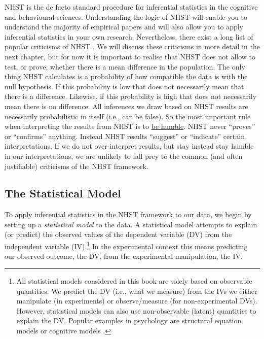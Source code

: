 \documentclass[
]{book}
\begin{document}
NHST is the de facto standard procedure for inferential statistics in the cognitive and behavioural sciences. Understanding the logic of NHST will enable you to understand the majority of empirical papers and will also allow you to apply inferential statistics in your own research. Nevertheless, there exist a long list of popular criticisms of NHST \citep[e.g.,][]{rozeboom1960, meehl1978, cohen1994, nickerson2000, wagenmakers2007}. We will discuss these criticisms in more detail in the next chapter, but for now it is important to realise that NHST does not allow to test, or prove, whether there is a mean difference in the population. The only thing NHST calculates is a probability of how compatible the data is with the null hypothesis. If this probability is low that does not necessarily mean that there is a difference. Likewise, if this probability is high that does not necessarily mean there is no difference. All inferences we draw based on NHST results are necessarily probabilistic in itself (i.e., can be false). So the most important rule when interpreting the results from NHST is to \href{https://youtu.be/tvTRZJ-4EyI}{be humble}. NHST never ``proves'' or ``confirms'' anything. Instead NHST results ``suggest'' or ``indicate'' certain interpretations. If we do not over-interpret results, but stay instead stay humble in our interpretations, we are unlikely to fall prey to the common (and often justifiable) criticisms of the NHST framework.

\hypertarget{the-statistical-model}{%
\subsection{The Statistical Model}\label{the-statistical-model}}

To apply inferential statistics in the NHST framework to our data, we begin by setting up a \emph{statistical model} to the data. A statistical model attempts to explain (or predict) the observed values of the dependent variable (DV) from the independent variable (IV).\footnote{All statistical models considered in this book are solely based on observable quantities. We predict the DV (i.e., what we measure) from the IVs we either manipulate (in experiments) or observe/measure (for non-experimental DVs). However, statistical models can also use non-observable (latent) quantities to explain the DV. Popular examples in psychology are structural equation models \citep[e.g.,][]{kline2015} or cognitive models \citep[e.g.,][]{lee2013}.} In the experimental context this means predicting our observed outcome, the DV, from the experimental manipulation, the IV.
\end{document}
